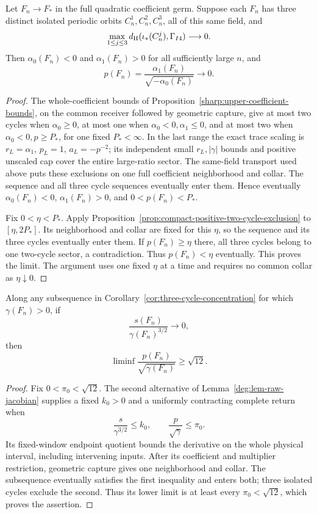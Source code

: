 \begin{corollary}
\label{cor:three-cycle-concentration}
Let \(F_n\to F_*\) in the full quadratic coefficient germ. Suppose
each \(F_n\) has three distinct isolated periodic orbits
\(C_n^1,C_n^2,C_n^3\), all of this same field, and
\[
 \max_{1\le j\le3}
 d_{\rm H}(\iota_*(C_n^j),\Gamma_{I4})\longrightarrow0.
\]
Then \(\alpha_0(F_n)<0\) and \(\alpha_1(F_n)>0\) for all
sufficiently large \(n\), and
\[
 p(F_n)=\frac{\alpha_1(F_n)}{\sqrt{-\alpha_0(F_n)}}
 \longrightarrow0.
\]
\end{corollary}

\begin{proof}
The whole-coefficient bounds of
Proposition~\ref{sharp:upper-coefficient-bounds}, on the common
receiver followed by geometric capture, give at most two cycles when
\(\alpha_0\ge0\), at most one when
\(\alpha_0<0,\alpha_1\le0\), and at most two when
\(\alpha_0<0,p\ge P_*\), for one fixed \(P_*<\infty\).
In the last range the exact trace scaling is
\(r_L=\alpha_1\), \(p_L=1\), \(a_L=-p^{-2}\);
its independent small \(r_L,|\gamma|\) bounds and positive unscaled
cap cover the entire large-ratio sector.
The same-field transport used above puts these exclusions on one full
coefficient neighborhood and collar. The sequence and all three cycle
sequences eventually enter them. Hence eventually
\(\alpha_0(F_n)<0\), \(\alpha_1(F_n)>0\), and
\(0<p(F_n)<P_*\).

Fix \(0<\eta<P_*\). Apply
Proposition~\ref{prop:compact-positive-two-cycle-exclusion} to
\([\eta,2P_*]\). Its neighborhood and collar are fixed for this
\(\eta\), so the sequence and its three cycles eventually enter
them. If \(p(F_n)\ge\eta\) there, all three cycles belong to
one two-cycle sector, a contradiction. Thus \(p(F_n)<\eta\)
eventually. This proves the limit. The argument uses one fixed
\(\eta\) at a time and requires no common collar as
\(\eta\downarrow0\).
\end{proof}

\begin{corollary}
\label{cor:positive-gamma-concentration}
Along any subsequence in Corollary~\ref{cor:three-cycle-concentration}
for which \(\gamma(F_n)>0\), if
\[
 \frac{s(F_n)}{\gamma(F_n)^{3/2}}\longrightarrow0,
\]
then
\[
 \liminf\frac{p(F_n)}{\sqrt{\gamma(F_n)}}\ge\sqrt{12}.
\]
\end{corollary}

\begin{proof}
Fix \(0<\pi_0<\sqrt{12}\). The second alternative of
Lemma~\ref{deg:lem-raw-jacobian} supplies a fixed \(k_0>0\)
and a uniformly contracting complete return when
\[
 \frac{s}{\gamma^{3/2}}\le k_0,\qquad
 \frac{p}{\sqrt\gamma}\le\pi_0.
\]
Its fixed-window endpoint quotient bounds the derivative on the
whole physical interval, including intervening inputs. After its
coefficient and multiplier restriction, geometric capture gives one
neighborhood and collar. The subsequence eventually satisfies the
first inequality and enters both; three isolated cycles exclude the
second. Thus its lower limit is at least every
\(\pi_0<\sqrt{12}\), which proves the assertion.
\end{proof}
